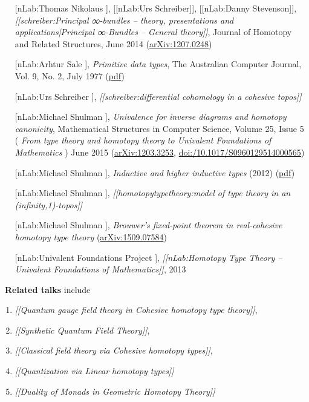 \documentclass[12pt,titlepage]{article}
\theoremstyle{plain}
\theoremstyle{definition}
\theoremstyle{remark}
\begin{document}
\begin{itemize}
\item [[nLab:Thomas Nikolaus]], [[nLab:Urs Schreiber]], [[nLab:Danny Stevenson]], \emph{[[schreiber:Principal ∞-bundles -- theory, presentations and applications|Principal ∞-Bundles -- General theory]]}, Journal of Homotopy and Related Structures, June 2014 (\href{http://arxiv.org/abs/1207.0248}{arXiv:1207.0248})
\item [[nLab:Arhtur Sale]], \emph{Primitive data types}, The Australian Computer Journal, Vol. 9, No. 2, July 1977 (\href{http://eprints.utas.edu.au/139/1/PrimitiveData.pdf}{pdf})
\item [[nLab:Urs Schreiber]], \emph{[[schreiber:differential cohomology in a cohesive topos]]}
\item [[nLab:Michael Shulman]], \emph{Univalence for inverse diagrams and homotopy canonicity}, Mathematical Structures in Computer Science, Volume 25, Issue 5 ( \emph{From type theory and homotopy theory to Univalent Foundations of Mathematics} ) June 2015 (\href{https://arxiv.org/abs/1203.3253}{arXiv:1203.3253}, \href{https://doi.org/10.1017/S0960129514000565}{doi:/10.1017/S0960129514000565})
\item [[nLab:Michael Shulman]], \emph{Inductive and higher inductive types} (2012) (\href{http://www.math.ias.edu/~mshulman/hottminicourse2012/04induction.pdf}{pdf})
\item [[nLab:Michael Shulman]], \emph{[[homotopytypetheory:model of type theory in an (infinity,1)-topos]]}
\item [[nLab:Michael Shulman]], \emph{Brouwer's fixed-point theorem in real-cohesive homotopy type theory} (\href{http://arxiv.org/abs/1509.07584}{arXiv:1509.07584})
\item [[nLab:Univalent Foundations Project]], \emph{[[nLab:Homotopy Type Theory -- Univalent Foundations of Mathematics]]}, 2013
\end{itemize}
$\,$
\textbf{Related talks} include
\begin{enumerate}%
\item \emph{[[Quantum gauge field theory in Cohesive homotopy type theory]]},
\item \emph{[[Synthetic Quantum Field Theory]]},
\item \emph{[[Classical field theory via Cohesive homotopy types]]},
\item \emph{[[Quantization via Linear homotopy types]]}
\item \emph{[[Duality of Monads in Geometric Homotopy Theory]]}
\end{enumerate}
\end{document}

